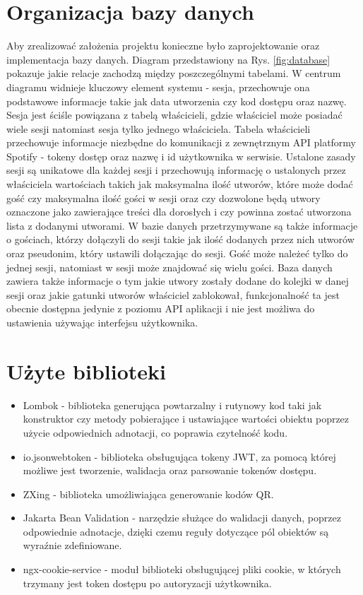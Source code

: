 \section{Organizacja bazy danych}
Aby zrealizować założenia projektu konieczne było zaprojektowanie oraz implementacja bazy danych. Diagram przedstawiony na Rys. \ref{fig:database} pokazuje jakie relacje zachodzą między poszczególnymi tabelami. W centrum diagramu widnieje kluczowy element systemu - sesja, przechowuje ona podstawowe informacje takie jak data utworzenia czy kod dostępu oraz nazwę. Sesja jest ściśle powiązana z tabelą właścicieli, gdzie właściciel może posiadać wiele sesji natomiast sesja tylko jednego właściciela. Tabela właścicieli przechowuje informacje niezbędne do komunikacji z zewnętrznym API platformy Spotify - tokeny dostęp oraz nazwę i id użytkownika w serwisie. Ustalone zasady sesji są unikatowe dla każdej sesji i przechowują informację o ustalonych przez właściciela wartościach takich jak maksymalna ilość utworów, które może dodać gość czy maksymalna ilość gości w sesji oraz czy dozwolone będą utwory oznaczone jako zawierające treści dla dorosłych i czy powinna zostać utworzona lista z dodanymi utworami. W bazie danych przetrzymywane są także informacje o gościach, którzy dołączyli do sesji takie jak ilość dodanych przez nich utworów oraz pseudonim, który ustawili dołączając do sesji. Gość może należeć tylko do jednej sesji, natomiast w sesji może znajdować się wielu gości. Baza danych zawiera także informacje o tym jakie utwory zostały dodane do kolejki w danej sesji oraz jakie gatunki utworów właściciel zablokował, funkcjonalność ta jest obecnie dostępna jedynie z poziomu API aplikacji i nie jest możliwa do ustawienia używając interfejsu użytkownika.


\section{Użyte biblioteki}
\begin{itemize}
\item Lombok - biblioteka generująca powtarzalny i rutynowy kod taki jak konstruktor czy metody pobierające i ustawiające wartości obiektu poprzez użycie odpowiednich adnotacji, co poprawia czytelność kodu. 

\item io.jsonwebtoken - biblioteka obsługująca tokeny JWT, za pomocą której możliwe jest tworzenie, walidacja oraz parsowanie tokenów dostępu.

\item ZXing - biblioteka umożliwiająca generowanie kodów QR.

\item Jakarta Bean Validation - narzędzie służące do walidacji danych, poprzez odpowiednie adnotacje, dzięki czemu reguły dotyczące pól obiektów są wyraźnie zdefiniowane.

\item ngx-cookie-service - moduł biblioteki obsługującej pliki cookie, w których trzymany jest token dostępu po autoryzacji użytkownika.
\end{itemize}

